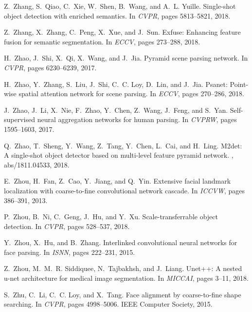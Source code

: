 \documentclass[10pt,twocolumn,letterpaper]{article}
\begin{document}
{\begin{thebibliography}{100}
Z.~Zhang, S.~Qiao, C.~Xie, W.~Shen, B.~Wang, and A.~L. Yuille.
\newblock Single-shot object detection with enriched semantics.
\newblock In {\em {CVPR}}, pages 5813--5821, 2018.

Z.~Zhang, X.~Zhang, C.~Peng, X.~Xue, and J.~Sun.
\newblock Exfuse: Enhancing feature fusion for semantic segmentation.
\newblock In {\em {ECCV}}, pages 273--288, 2018.

H.~Zhao, J.~Shi, X.~Qi, X.~Wang, and J.~Jia.
\newblock Pyramid scene parsing network.
\newblock In {\em {CVPR}}, pages 6230--6239, 2017.

H.~Zhao, Y.~Zhang, S.~Liu, J.~Shi, C.~C. Loy, D.~Lin, and J.~Jia.
\newblock Psanet: Point-wise spatial attention network for scene parsing.
\newblock In {\em {ECCV}}, pages 270--286, 2018.

J.~Zhao, J.~Li, X.~Nie, F.~Zhao, Y.~Chen, Z.~Wang, J.~Feng, and S.~Yan.
\newblock Self-supervised neural aggregation networks for human parsing.
\newblock In {\em {CVPRW}}, pages 1595--1603, 2017.

Q.~Zhao, T.~Sheng, Y.~Wang, Z.~Tang, Y.~Chen, L.~Cai, and H.~Ling.
\newblock M2det: {A} single-shot object detector based on multi-level feature
  pyramid network.
, abs/1811.04533, 2018.

E.~Zhou, H.~Fan, Z.~Cao, Y.~Jiang, and Q.~Yin.
\newblock Extensive facial landmark localization with coarse-to-fine
  convolutional network cascade.
\newblock In {\em {ICCVW}}, pages 386--391, 2013.

P.~Zhou, B.~Ni, C.~Geng, J.~Hu, and Y.~Xu.
\newblock Scale-transferrable object detection.
\newblock In {\em {CVPR}}, pages 528--537, 2018.

Y.~Zhou, X.~Hu, and B.~Zhang.
\newblock Interlinked convolutional neural networks for face parsing.
\newblock In {\em {ISNN}}, pages 222--231, 2015.

Z.~Zhou, M.~M.~R. Siddiquee, N.~Tajbakhsh, and J.~Liang.
\newblock Unet++: {A} nested u-net architecture for medical image segmentation.
\newblock In {\em {MICCAI}}, pages 3--11, 2018.

S.~Zhu, C.~Li, C.~C. Loy, and X.~Tang.
\newblock Face alignment by coarse-to-fine shape searching.
\newblock In {\em {CVPR}}, pages 4998--5006. {IEEE} Computer Society, 2015.


\end{thebibliography}}
\end{document}
